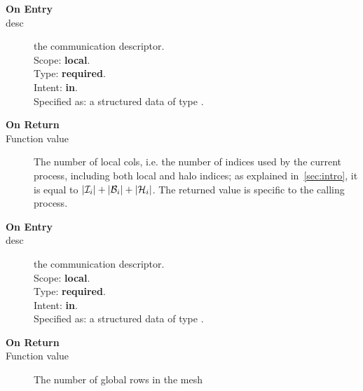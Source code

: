 

\begin{description}
\item[\bf On Entry]
\item[desc] the communication descriptor.\\
Scope: {\bf local}.\\
Type: {\bf required}.\\
Intent: {\bf in}.\\
Specified as: a structured data of type \descdata.
\end{description}

\begin{description}
\item[\bf On Return]
\item[Function value] The number of local cols, i.e. the number of
  indices used by the current process, including both local and halo
  indices; as explained in~\ref{sec:intro}, 
  it is equal to  $|{\cal I}_i| + |{\cal B}_i| +|{\cal H}_i|$. The
  returned value is specific to the calling process. 
\end{description}




\begin{description}
\item[\bf On Entry]
\item[desc] the communication descriptor.\\
Scope: {\bf local}.\\
Type: {\bf required}.\\
Intent: {\bf in}.\\
Specified as: a structured data of type \descdata.
\end{description}

\begin{description}
\item[\bf On Return]
\item[Function value] The number of global rows in the mesh
\end{description}



